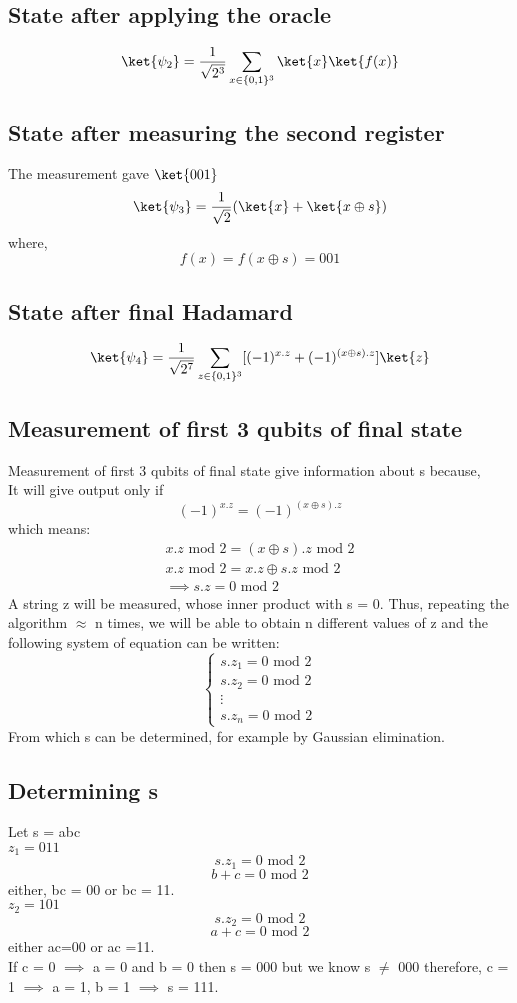 \documentclass[11pt, a4paper]{article}
\begin{document}
\subsection{State after applying the oracle}
\[
    \ket{\psi_2} = \frac{1}{\sqrt{2^{3} }}\sum\limits_{x \in\{0,1\}^3} \ket{x}\ket{f(x)}
\]
\subsection{State after measuring the second register}
The measurement gave \(\ket{001}\) 
\[
    \ket{\psi_3} = \frac{1}{\sqrt{2}}(\ket{x}+\ket{x \oplus s})
\]
where, 
\[
    f(x) = f(x\oplus s) = 001
\]
\subsection{State after final Hadamard}
\[
    \ket{\psi_4} = \frac{1}{\sqrt{2^{7}}} \sum\limits_{z\in\{0,1\}^3}[(-1)^{x . z}+(-1)^{(x\oplus s) . z}]\ket{z}
\]
\subsection{Measurement of first 3 qubits of final state}
Measurement of first 3 qubits of final state give information about s because,\\
It will give output only if 
\[
    (-1)^{x . z}=(-1)^{(x\oplus s) . z} 
\]
which means:
\begin{gather*}
    x . z \text { mod }2 =  (x \oplus s).z \text{ mod } 2\\
    x . z \text{ mod } 2 = x.z \oplus s.z \text{ mod } 2\\
    \implies s.z = 0 \text{ mod } 2 
\end{gather*}
A string z will be measured, whose inner product with s = 0. Thus, repeating the algorithm $\approx$ n times, we will be able to obtain n different values of z and the following system of equation can be written:
\[
    \begin{cases}
        s.z_1 = 0 \text{ mod } 2\\
        s.z_2 = 0 \text{ mod } 2\\
        \vdots\\
        s.z_n = 0 \text{ mod } 2
    \end{cases}
\]
From which s can be determined, for example by Gaussian elimination.
\subsection{Determining s}
Let s = abc\\
\(z_1 = 011\)
\[
    s.z_1 = 0 \text{ mod } 2
\]
\[
    b+c = 0 \text{ mod } 2
\]
either, bc = 00 or bc = 11. \\
\(z_2 = 101\) 
\[
    s.z_2 = 0 \text{ mod } 2
\]
\[
    a+c = 0 \text{ mod } 2
\]
either ac=00 or ac =11. \\
If c = 0 \(\implies \) a = 0 and b = 0 then s = 000 but we know s \(\neq\) 000  therefore, c = 1 \(\implies \) a = 1, b = 1 \(\implies \)  s = 111. 
\end{document}
